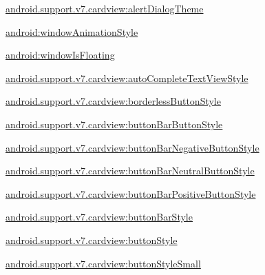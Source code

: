 {\ttfamily \hyperlink{classandroid_1_1support_1_1v7_1_1cardview_1_1R_1_1styleable_acfcfac63c3692a282515b5e87698c92f}{android.\+support.\+v7.\+cardview\+:alert\+Dialog\+Theme}}

{\ttfamily \hyperlink{classandroid_1_1support_1_1v7_1_1cardview_1_1R_1_1styleable_a3b2eccca8b00b0eb575d2021f078cbb8}{android\+:window\+Animation\+Style}}

{\ttfamily \hyperlink{classandroid_1_1support_1_1v7_1_1cardview_1_1R_1_1styleable_a4c9f6f32c92062c411f5c4c6fe2b1da4}{android\+:window\+Is\+Floating}}

{\ttfamily \hyperlink{classandroid_1_1support_1_1v7_1_1cardview_1_1R_1_1styleable_ae014b1ac4a3413251376574568270a19}{android.\+support.\+v7.\+cardview\+:auto\+Complete\+Text\+View\+Style}}

{\ttfamily \hyperlink{classandroid_1_1support_1_1v7_1_1cardview_1_1R_1_1styleable_ac59aefe71e126f596474d5fa2287b1ce}{android.\+support.\+v7.\+cardview\+:borderless\+Button\+Style}}

{\ttfamily \hyperlink{classandroid_1_1support_1_1v7_1_1cardview_1_1R_1_1styleable_afd2644581cb07d6cd4ed27a053bf6525}{android.\+support.\+v7.\+cardview\+:button\+Bar\+Button\+Style}}

{\ttfamily \hyperlink{classandroid_1_1support_1_1v7_1_1cardview_1_1R_1_1styleable_a3f0d3655b3dc02d0f7f8bac6422802ad}{android.\+support.\+v7.\+cardview\+:button\+Bar\+Negative\+Button\+Style}}

{\ttfamily \hyperlink{classandroid_1_1support_1_1v7_1_1cardview_1_1R_1_1styleable_afc6ef0b8097f2e788fe27aed74360c29}{android.\+support.\+v7.\+cardview\+:button\+Bar\+Neutral\+Button\+Style}}

{\ttfamily \hyperlink{classandroid_1_1support_1_1v7_1_1cardview_1_1R_1_1styleable_abfba42dac502deb993340e486ec71e30}{android.\+support.\+v7.\+cardview\+:button\+Bar\+Positive\+Button\+Style}}

{\ttfamily \hyperlink{classandroid_1_1support_1_1v7_1_1cardview_1_1R_1_1styleable_a79edaebda634ee0aecb95bc0b4d88a2b}{android.\+support.\+v7.\+cardview\+:button\+Bar\+Style}}

{\ttfamily \hyperlink{classandroid_1_1support_1_1v7_1_1cardview_1_1R_1_1styleable_a604ddffad2b433e9cf1cfb3aa9f82a43}{android.\+support.\+v7.\+cardview\+:button\+Style}}

{\ttfamily \hyperlink{classandroid_1_1support_1_1v7_1_1cardview_1_1R_1_1styleable_a575b1d9c7fa1adee560df29f9326b54b}{android.\+support.\+v7.\+cardview\+:button\+Style\+Small}}

